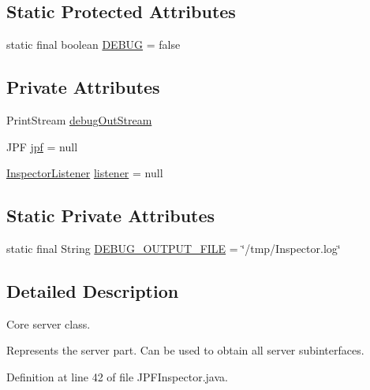 \subsection*{Static Protected Attributes}
\begin{DoxyCompactItemize}
\item 
static final boolean \hyperlink{classgov_1_1nasa_1_1jpf_1_1inspector_1_1server_1_1jpf_1_1_j_p_f_inspector_a53359fda8287a93e377022db230c7c1b}{D\+E\+B\+UG} = false
\end{DoxyCompactItemize}
\subsection*{Private Attributes}
\begin{DoxyCompactItemize}
\item 
Print\+Stream \hyperlink{classgov_1_1nasa_1_1jpf_1_1inspector_1_1server_1_1jpf_1_1_j_p_f_inspector_a1ce85f8029da55fe1d5d2f0b0473b72d}{debug\+Out\+Stream}
\item 
J\+PF \hyperlink{classgov_1_1nasa_1_1jpf_1_1inspector_1_1server_1_1jpf_1_1_j_p_f_inspector_a04fbb7b09b55ee2c777428d3833fc353}{jpf} = null
\item 
\hyperlink{classgov_1_1nasa_1_1jpf_1_1inspector_1_1server_1_1jpf_1_1_inspector_listener}{Inspector\+Listener} \hyperlink{classgov_1_1nasa_1_1jpf_1_1inspector_1_1server_1_1jpf_1_1_j_p_f_inspector_a8d5026db024c892d5569d22c5f2f0a5f}{listener} = null
\end{DoxyCompactItemize}
\subsection*{Static Private Attributes}
\begin{DoxyCompactItemize}
\item 
static final String \hyperlink{classgov_1_1nasa_1_1jpf_1_1inspector_1_1server_1_1jpf_1_1_j_p_f_inspector_a1f8b5dc136f3fb2904ccb4d6f230b723}{D\+E\+B\+U\+G\+\_\+\+O\+U\+T\+P\+U\+T\+\_\+\+F\+I\+LE} = \char`\"{}/tmp/Inspector.\+log\char`\"{}
\end{DoxyCompactItemize}


\subsection{Detailed Description}
Core server class. 

Represents the server part. Can be used to obtain all server subinterfaces. 

Definition at line 42 of file J\+P\+F\+Inspector.\+java.



